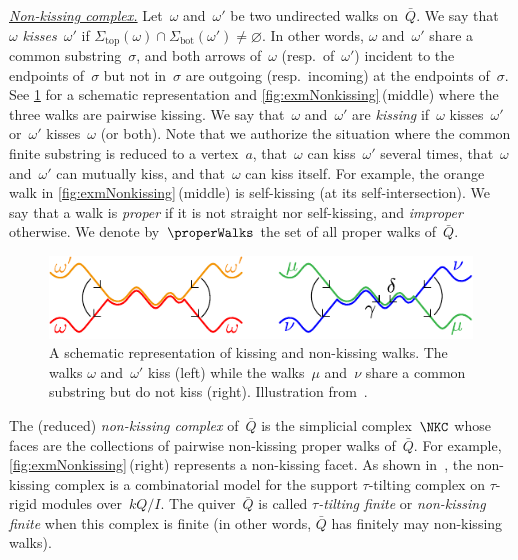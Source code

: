 \documentclass{amsart}
\theoremstyle{definition}
\newcommand{\darkblue}{\color{darkblue}} %
\newcommand{\defn}[1]{\textsl{\darkblue #1}} %
\newcommand{\para}[1]{\medskip\noindent\uline{\textit{#1.}}} %
\newcommand{\quiver}{\bar Q} %
\renewcommand{\top}{\mathrm{top}} %
\newcommand{\bottom}{\mathrm{bot}} %
\begin{document}
\para{Non-kissing complex}
%
Let~$\omega$ and~$\omega'$ be two undirected walks on~$\quiver$.
We say that~$\omega$ \defn{kisses}~$\omega'$ if ${\Sigma_\top(\omega) \cap \Sigma_\bottom(\omega')} \ne \varnothing$.
In other words, $\omega$ and~$\omega'$ share a common substring~$\sigma$, and both arrows of~$\omega$ (resp.~of~$\omega'$) incident to the endpoints of~$\sigma$ but not in~$\sigma$ are outgoing (resp.~incoming) at the endpoints of~$\sigma$.
See \cref{fig:kissingCrossing} for a schematic representation and \cref{fig:exmNonkissing}\,(middle) where the three walks are pairwise kissing.
We say that~$\omega$ and~$\omega'$ are \defn{kissing} if~$\omega$ kisses~$\omega'$ or~$\omega'$ kisses~$\omega$ (or both).
Note that we authorize the situation where the common finite substring is reduced to a vertex~$a$, that~$\omega$ can kiss~$\omega'$ several times, that~$\omega$ and~$\omega'$ can mutually kiss, and that~$\omega$ can kiss itself.
For example, the orange walk in \cref{fig:exmNonkissing}\,(middle) is self-kissing (at its self-intersection).
We say that a walk is \defn{proper} if it is not straight nor self-kissing, and \defn{improper} otherwise.
We denote by~$\properWalks$ the set of all proper walks of~$\quiver$.

\begin{figure}[h]
	\capstart
	\centerline{\includegraphics[scale=1]{kissingCrossing}}
	\caption{A schematic representation of kissing and non-kissing walks. The walks $\omega$ and~$\omega'$ kiss (left) while the walks~$\mu$ and~$\nu$ share a common substring but do not kiss (right). Illustration from~\cite{PaluPilaudPlamondon-nonkissing}.}
	\label{fig:kissingCrossing}
\end{figure}

The (reduced) \defn{non-kissing complex} of~$\quiver$ is the simplicial complex~$\NKC$ whose faces are the collections of pairwise non-kissing proper walks of~$\quiver$.
For example, \cref{fig:exmNonkissing}\,(right) represents a non-kissing facet.
As shown in~\cite[Thm.~2.46]{PaluPilaudPlamondon-nonkissing}, the non-kissing complex is a combinatorial model for the support $\tau$-tilting complex on $\tau$-rigid modules over~$kQ/I$.
The quiver~$\quiver$ is called \defn{$\tau$-tilting finite} or \defn{non-kissing finite} when this complex is finite (in other words, $\quiver$ has finitely may non-kissing walks).
\end{document}
